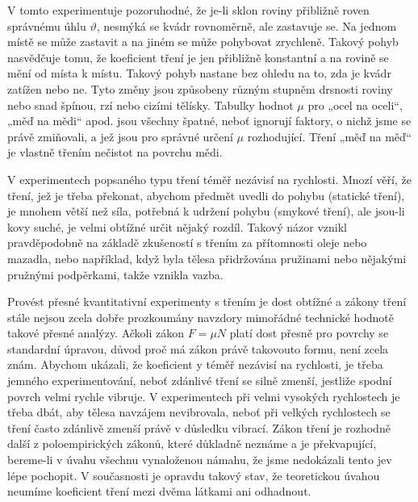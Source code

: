     V tomto experimentuje pozoruhodné, že je-li sklon roviny přibližně roven správnému úhlu 
    \(\vartheta\), nesmýká se kvádr rovnoměrně, ale zastavuje se. Na jednom místě se může zastavit 
    a na jiném se může pohybovat zrychleně. Takový pohyb nasvědčuje tomu, že koeficient tření je 
    jen přibližně konstantní a na rovině se mění od místa k místu. Takový pohyb nastane bez ohledu 
    na to, zda je kvádr zatížen nebo ne. Tyto změny jsou způsobeny různým stupněm drsnosti roviny 
    nebo snad špínou, rzí nebo cizími tělísky. Tabulky hodnot \(\mu\) pro „ocel na oceli“, „měď na 
    mědi“ apod. jsou všechny špatné, neboť ignorují faktory, o nichž jsme se právě zmiňovali, a jež 
    jsou pro správné určení \(\mu\) rozhodující. Tření „měď na měď“ je vlastně třením nečistot na 
    povrchu mědi.
    
    V experimentech popsaného typu tření téměř nezávisí na rychlosti. Mnozí věří, že tření, jež je 
    třeba překonat, abychom předmět uvedli do pohybu (statické tření), je mnohem větší než síla, 
    potřebná k udržení pohybu (smykové tření), ale jsou-li kovy suché, je velmi obtížné určit 
    nějaký rozdíl. Takový názor vznikl pravděpodobně na základě zkušeností s třením za přítomnosti 
    oleje nebo mazadla, nebo například, když byla tělesa přidržována pružinami nebo nějakými 
    pružnými podpěrkami, takže vznikla vazba.
    
    Provést přesné kvantitativní experimenty s třením je dost obtížné a zákony tření stále nejsou 
    zcela dobře prozkoumány navzdory mimořádné technické hodnotě takové přesné analýzy. Ačkoli 
    zákon \(F= \mu N\) platí dost přesně pro povrchy se standardní úpravou, důvod proč má zákon 
    právě takovouto formu, není zcela znám. Abychom ukázali, že koeficient y téměř nezávisí na 
    rychlosti, je třeba jemného experimentování, neboť zdánlivé tření se silně zmenší, jestliže 
    spodní povrch velmi rychle vibruje. V experimentech při velmi vysokých rychlostech je třeba 
    dbát, aby tělesa navzájem nevibrovala, neboť při velkých rychlostech se tření často zdánlivě 
    zmenší právě v důsledku vibrací. Zákon tření je rozhodně další z poloempirických zákonů, které 
    důkladně neznáme a je překvapující, bereme-li v úvahu všechnu vynaloženou námahu, že jsme 
    nedokázali tento jev lépe pochopit. V současnosti je opravdu takový stav, že teoretickou úvahou 
    neumíme koeficient tření mezi dvěma látkami ani odhadnout.
    

